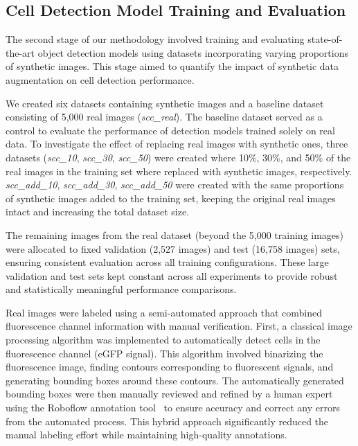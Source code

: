 \subsection{Cell Detection Model Training and Evaluation}
\label{subsec:cell-detection-model-training-and-evaluation}
The second stage of our methodology involved training and evaluating state-of-the-art object detection models using datasets incorporating varying proportions of synthetic images.
This stage aimed to quantify the impact of synthetic data augmentation on cell detection performance.

We created six datasets containing synthetic images and a baseline dataset consisting of 5,000 real images (\textit{scc\_real}).
The baseline dataset served as a control to evaluate the performance of detection models trained solely on real data.
To investigate the effect of replacing real images with synthetic ones, three datasets (\textit{scc\_10}, \textit{scc\_30}, \textit{scc\_50}) were created where 10\%, 30\%, and 50\% of the real images in the training set where replaced with synthetic images, respectively.
\textit{scc\_add\_10}, \textit{scc\_add\_30}, \textit{scc\_add\_50} were created with the same proportions of synthetic images added to the training set, keeping the original real images intact and increasing the total dataset size.

The remaining images from the real dataset (beyond the 5,000 training images) were allocated to fixed validation (2,527 images) and test (16,758 images) sets, ensuring consistent evaluation across all training configurations.
These large validation and test sets kept constant across all experiments to provide robust and statistically meaningful performance comparisons.

Real images were labeled using a semi-automated approach that combined fluorescence channel information with manual verification.
First, a classical image processing algorithm was implemented to automatically detect cells in the fluorescence channel (eGFP signal).
This algorithm involved binarizing the fluorescence image, finding contours corresponding to fluorescent signals, and generating bounding boxes around these contours.
The automatically generated bounding boxes were then manually reviewed and refined by a human expert using the Roboflow annotation tool~\cite{dwyer_roboflow_nodate} to ensure accuracy and correct any errors from the automated process.
This hybrid approach significantly reduced the manual labeling effort while maintaining high-quality annotations.

